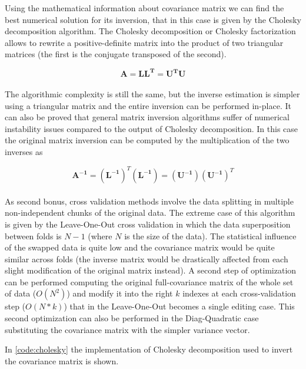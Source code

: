 \documentclass{standalone}
\begin{document}
Using the mathematical information about covariance matrix we can find the best numerical solution for its inversion, that in this case is given by the Cholesky decomposition algorithm.
The Cholesky decomposition or Cholesky factorization allows to rewrite a positive-definite matrix into the product of two triangular matrices (the first is the conjugate transposed of the second).

\begin{equation}
\mathbf{A} = \mathbf{LL^T} = \mathbf{U^TU}
\end{equation}
\\
The algorithmic complexity is still the same, but the inverse estimation is simpler using a triangular matrix and the entire inversion can be performed in-place.
It can also be proved that general matrix inversion algorithms suffer of numerical instability issues compared to the output of Cholesky decomposition.
In this case the original matrix inversion can be computed by the multiplication of the two inverses as

\begin{equation}
\mathbf{A^{-1}} = (\mathbf{L^{-1}})^T(\mathbf{L^{-1}}) = (\mathbf{U^{-1}})(\mathbf{U^{-1}})^T
\end{equation}
\\
As second bonus, cross validation methods involve the data splitting in multiple non-independent chunks of the original data.
The extreme case of this algorithm is given by the Leave-One-Out cross validation in which the data superposition between folds is $N-1$ (where $N$ is the size of the data).
The statistical influence of the swapped data is quite low and the covariance matrix would be quite similar across folds (the inverse matrix would be drastically affected from each slight modification of the original matrix instead).
A second step of optimization can be performed computing the original full-covariance matrix of the whole set of data ($O(N^2)$) and modify it into the right $k$ indexes at each cross-validation step ($O(N*k)$) that in the Leave-One-Out becomes a single editing case.
This second optimization can also be performed in the Diag-Quadratic case substituting the covariance matrix with the simpler variance vector.

In \ref{code:cholesky} the implementation of Cholesky decomposition used to invert the covariance matrix is shown.
\end{document}

